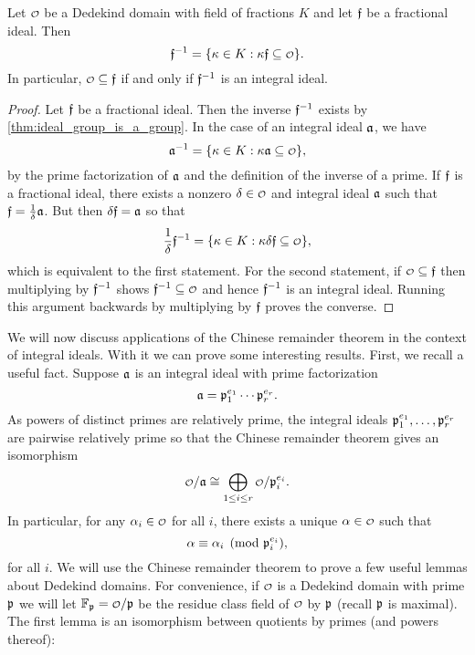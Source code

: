     \begin{proposition}\label{prop:explicit_inverse_ideal}
      Let $\smc{O}$ be a Dedekind domain with field of fractions $K$ and let $\mathfrak{f}$ be a fractional ideal. Then
      \[
        \mf{f}^{-1} = \{\k \in K:\k\mf{f} \subseteq \smc{O}\}.
      \]
      In particular, $\smc{O} \subseteq \mf{f}$ if and only if $\mathfrak{f}^{-1}$ is an integral ideal.
    \end{proposition}
    \begin{proof}
      Let $\mathfrak{f}$ be a fractional ideal. Then the inverse $\mathfrak{f}^{-1}$ exists by \cref{thm:ideal_group_is_a_group}. In the case of an integral ideal $\mathfrak{a}$, we have
      \[
        \mf{a}^{-1} = \{\k \in K:\k\mf{a} \subseteq \smc{O}\},
      \]
      by the prime factorization of $\mathfrak{a}$ and the definition of the inverse of a prime. If $\mathfrak{f}$ is a fractional ideal, there exists a nonzero $\d \in \smc{O}$ and integral ideal $\mathfrak{a}$ such that $\mathfrak{f} = \frac{1}{\delta}\mathfrak{a}$. But then $\delta\mathfrak{f} = \mathfrak{a}$ so that
      \[
        \frac{1}{\d}\mf{f}^{-1} = \{\k \in K:\k\d\mf{f} \subseteq \smc{O}\},
      \]
      which is equivalent to the first statement. For the second statement, if $\smc{O} \subseteq \mf{f}$ then multiplying by $\mathfrak{f}^{-1}$ shows $\mf{f}^{-1} \subseteq \smc{O}$ and hence $\mathfrak{f}^{-1}$ is an integral ideal. Running this argument backwards by multiplying by $\mathfrak{f}$ proves the converse.
    \end{proof}

    We will now discuss applications of the Chinese remainder theorem in the context of integral ideals. With it we can prove some interesting results. First, we recall a useful fact. Suppose $\mathfrak{a}$ is an integral ideal with prime factorization
    \[
      \mathfrak{a} = \mathfrak{p}_{1}^{e_{1}} \cdots \mathfrak{p}_{r}^{e_{r}}.
    \]
    As powers of distinct primes are relatively prime, the integral ideals $\mathfrak{p}_{1}^{e_{1}},\ldots,\mathfrak{p}_{r}^{e_{r}}$ are pairwise relatively prime so that the Chinese remainder theorem gives an isomorphism
    \[
      \smc{O}/\mf{a} \cong \bigop_{1 \le i \le r}\smc{O}/\mf{p}_{i}^{e_{i}}.
    \]
    In particular, for any $\a_{i} \in \smc{O}$ for all $i$, there exists a unique $\a \in \smc{O}$ such that
    \[
      \alpha \equiv \alpha_{i} \pmod{\mathfrak{p}_{i}^{e_{i}}},
    \]
    for all $i$. We will use the Chinese remainder theorem to prove a few useful lemmas about Dedekind domains. For convenience, if $\smc{O}$ is a Dedekind domain with prime $\mathfrak{p}$ we will let $\F_{\mf{p}} = \smc{O}/\mf{p}$ be the residue class field of $\smc{O}$ by $\mathfrak{p}$ (recall $\mathfrak{p}$ is maximal). The first lemma is an isomorphism between quotients by primes (and powers thereof):

